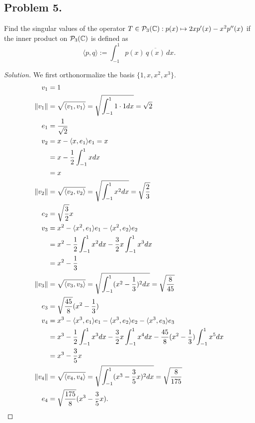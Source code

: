 \documentclass{article}
\begin{document}
\newpage
\subsection*{Problem 5.}
Find the singular values of the operator $T  \in {\cal P}_3(\mathbb{C}): p(x) \mapsto 2xp'(x)-x^2p''(x)$ if the inner product on ${\cal P}_3(\mathbb{C})$ is defined as
$$ \langle p , q\rangle := \int_{-1}^1 p(x)\,\overline{q(x)} \,dx.$$
\begin{proof}[Solution]
    We first orthonormalize the basis $\{1,x,x^2,x^3\}$.
    \begin{align*}
        v_1 & = 1 \\
        \lVert v_1\rVert & = \sqrt{\langle v_1, v_1\rangle} = \sqrt{\int_{-1}^1 1\cdot 1 dx} = \sqrt{2} \\
        e_1 & = \frac{1}{\sqrt{2}} \\
        v_2 & = x - \langle x, e_1\rangle e_1 = x \\
        & = x - \frac{1}{2}\int_{-1}^1 x dx \\
        & = x \\
        \lVert v_2\rVert & = \sqrt{\langle v_2, v_2\rangle} = \sqrt{\int_{-1}^1 x^2 dx} = \sqrt{\frac{2}{3}} \\
        e_2 & = \sqrt{\frac{3}{2}}x \\
        v_3 & = x^2 - \langle x^2, e_1\rangle e_1 - \langle x^2, e_2\rangle e_2 \\
        & = x^2 - \frac{1}{2}\int_{-1}^1 x^2 dx - \frac{3}{2}x\int_{-1}^1 x^3 dx \\
        & = x^2 - \frac{1}{3} \\
        \lVert v_3\rVert & = \sqrt{\langle v_3, v_3\rangle} = \sqrt{\int_{-1}^1 (x^2 - \frac{1}{3})^2 dx} =
        \sqrt{\frac{8}{45}} \\
        e_3 & = \sqrt{\frac{45}{8}}(x^2 - \frac{1}{3}) \\
        v_4 & = x^3 - \langle x^3, e_1\rangle e_1 - \langle x^3, e_2\rangle e_2 - \langle x^3, e_3\rangle e_3 \\
        & = x^3 - \frac{1}{2}\int_{-1}^1 x^3 dx - \frac{3}{2}x\int_{-1}^1 x^4 dx -
        \frac{45}{8}(x^2 - \frac{1}{3})\int_{-1}^1 x^5 dx \\
        & = x^3 - \frac{3}{5}x \\
        \lVert v_4\rVert & = \sqrt{\langle v_4, v_4\rangle} = \sqrt{\int_{-1}^1 (x^3 - \frac{3}{5}x)^2 dx} =
        \sqrt{\frac{8}{175}} \\
        e_4 & = \sqrt{\frac{175}{8}}(x^3 - \frac{3}{5}x).
    \end{align*}


\end{proof}
\end{document}
